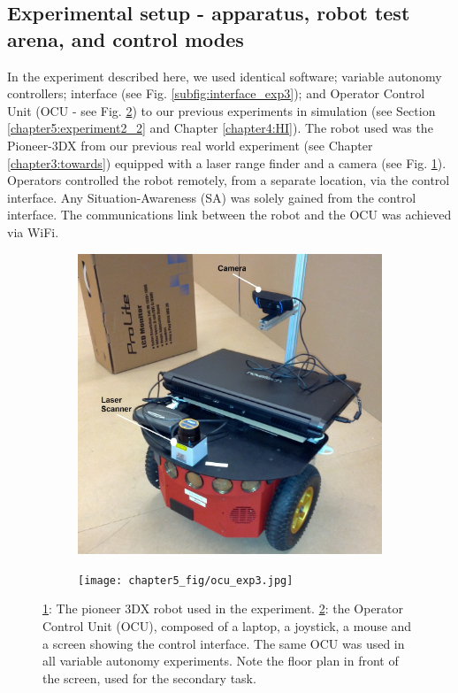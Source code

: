 \documentclass[a4paper,12pt,oneside,openright]{bhamthesis}
\begin{document}
\subsection{Experimental setup - apparatus, robot test arena, and control modes}
In the experiment described here, we used identical software; variable autonomy controllers; interface (see Fig. \ref{subfig:interface_exp3}); and Operator Control Unit (OCU - see Fig. \ref{subfig:OCU_exp3}) to our previous experiments in simulation (see Section \ref{chapter5:experiment2_2} and Chapter \ref{chapter4:HI}). The robot used was the Pioneer-3DX from our previous real world experiment (see Chapter \ref{chapter3:towards}) equipped with a laser range finder and a camera (see Fig. \ref{subfig:pioneer_exp3}). Operators controlled the robot remotely, from a separate location, via the control interface. Any Situation-Awareness (SA) was solely gained from the control interface. The communications link between the robot and the OCU was achieved via WiFi.

\begin{figure}
		\centering
		\begin{subfigure}[b]{0.45\textwidth}
			\centering
			\includegraphics[width=\textwidth]{chapter5_fig/pioneer.jpg}
			\caption{}
			\label{subfig:pioneer_exp3}
		\end{subfigure}
		\hfill
		\begin{subfigure}[b]{0.5\textwidth}
			\centering
			\texttt{[image: chapter5\_fig/ocu\_exp3.jpg]}
			\caption{}
			\label{subfig:OCU_exp3}
		\end{subfigure}
		\hfill
		\caption{ \ref{subfig:pioneer_exp3}: The pioneer 3DX robot used in the experiment. \ref{subfig:OCU_exp3}: the Operator Control Unit (OCU), composed of a laptop, a joystick, a mouse and a screen showing the control interface. The same OCU was used in all variable autonomy experiments. Note the floor plan in front of the screen, used for the secondary task.}
		\label{fig:robot_ocu_exp3}
	\end{figure}
      
\end{document}
